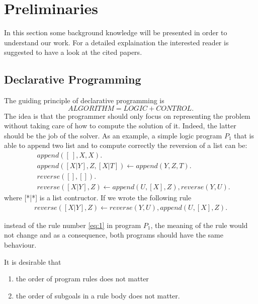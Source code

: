 \section{Preliminaries}
In this section some background knowledge will be presented in order to understand our work. For a detailed explaination the interested reader is suggested to have a look at the cited papers. 
\subsection{Declarative Programming}
The guiding principle of declarative programming is 
\[ALGORITHM = LOGIC + CONTROL.\]
The idea is that the programmer should only focus on representing the problem without taking care of how to compute the solution of it. Indeed, the latter should be the job of the solver. As an example, a simple logic program \(P_1\) that  is able to append two list and to compute correctly the reversion of a list can be: 
\begin{align}
&append ([\:], X, X). \\
&append ([X|Y], Z, [X|T ]) \leftarrow append (Y, Z, T ). \\
&reverse([ ], [ ]).\\
&reverse([X|Y ], Z) \leftarrow append (U, [X], Z), reverse(Y, U ). \label{eq:1}
\end{align}
where [*|*] is a list contructor.
If we wrote the following rule 
\begin{align}
reverse([X|Y ], Z) \leftarrow reverse(Y, U ), append(U, [X], Z). \label{eq:2}
\end{align}

instead of the rule number \ref{eq:1} in program \(P_1\), the meaning of the rule would not change and as a consequence, both programs should have the same behaviour. 

It is desirable that
\begin{enumerate}
\item the order of program rules does not matter
\item the order of subgoals in a rule body does not matter.
\end{enumerate}

